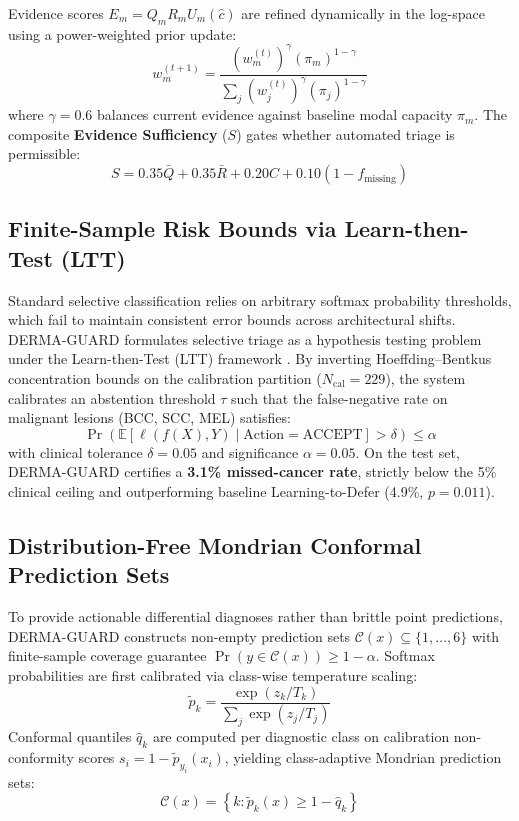 \documentclass[conference]{IEEEtran}
\begin{document}
Evidence scores $E_m = Q_m R_m U_m(\hat{c})$ are refined dynamically in the log-space using a power-weighted prior update:
\begin{equation}
w_m^{(t+1)} = \frac{\left(w_m^{(t)}\right)^\gamma \left(\pi_m\right)^{1-\gamma}}{\sum_j \left(w_j^{(t)}\right)^\gamma \left(\pi_j\right)^{1-\gamma}}
\end{equation}
where $\gamma = 0.6$ balances current evidence against baseline modal capacity $\pi_m$. The composite \textbf{Evidence Sufficiency} ($S$) gates whether automated triage is permissible:
\begin{equation}
S = 0.35 \bar{Q} + 0.35 \bar{R} + 0.20 C + 0.10 (1 - f_{\text{missing}})
\end{equation}

\subsection{Finite-Sample Risk Bounds via Learn-then-Test (LTT)}
Standard selective classification relies on arbitrary softmax probability thresholds, which fail to maintain consistent error bounds across architectural shifts. DERMA-GUARD formulates selective triage as a hypothesis testing problem under the Learn-then-Test (LTT) framework \cite{bates2021testing}. By inverting Hoeffding--Bentkus concentration bounds on the calibration partition ($N_{\text{cal}}=229$), the system calibrates an abstention threshold $\tau$ such that the false-negative rate on malignant lesions (BCC, SCC, MEL) satisfies:
\begin{equation}
\Pr\left( \mathbb{E}\left[ \ell(f(X), Y) \mid \text{Action} = \text{ACCEPT} \right] > \delta \right) \le \alpha
\end{equation}
with clinical tolerance $\delta = 0.05$ and significance $\alpha = 0.05$. On the test set, DERMA-GUARD certifies a \textbf{3.1\% missed-cancer rate}, strictly below the 5\% clinical ceiling and outperforming baseline Learning-to-Defer (4.9\%, $p=0.011$).

\subsection{Distribution-Free Mondrian Conformal Prediction Sets}
To provide actionable differential diagnoses rather than brittle point predictions, DERMA-GUARD constructs non-empty prediction sets $\mathcal{C}(x) \subseteq \{1, \dots, 6\}$ with finite-sample coverage guarantee $\Pr(y \in \mathcal{C}(x)) \ge 1 - \alpha$. Softmax probabilities are first calibrated via class-wise temperature scaling:
\begin{equation}
\tilde{p}_k = \frac{\exp(z_k / T_k)}{\sum_j \exp(z_j / T_j)}
\end{equation}
Conformal quantiles $\hat{q}_k$ are computed per diagnostic class on calibration non-conformity scores $s_i = 1 - \tilde{p}_{y_i}(x_i)$, yielding class-adaptive Mondrian prediction sets:
\begin{equation}
\mathcal{C}(x) = \left\{ k : \tilde{p}_k(x) \ge 1 - \hat{q}_k \right\}
\end{equation}
\end{document}
